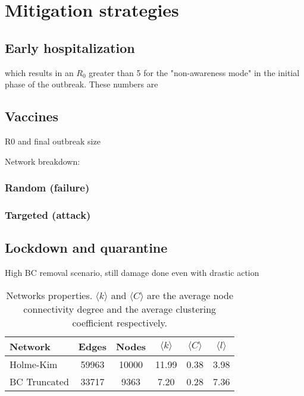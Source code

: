 \documentclass[DIV=12, BCOR=0pt]{scrartcl}  %
\begin{document}
  
  
  \section{Mitigation strategies} %
  \label{sec:immuni}
  
  
   
   \subsection{Early hospitalization}
   which results in an $R_0$ greater than 5 for the "non-awareness mode" in the initial phase of the outbreak. These numbers are
   \citep{Firth2020} 
  
  \subsection{Vaccines}
  R0 and final outbreak size
  
  Network breakdown:
  \subsubsection{Random (failure)}
	\subsubsection{Targeted (attack)}

	\subsection{Lockdown and quarantine}
	High BC removal scenario, still damage done even with drastic action
	
	\begin{table}[h!]
		\centering
		\caption{Networks properties. $\langle k \rangle$ and $\langle C \rangle$ are the average node connectivity degree and the average clustering coefficient respectively. }
		\label{tab:lock_networks}
		\begin{tabular}{lccccc}
			\toprule
			Network &  Edges &  Nodes & $\langle k \rangle$ & $\langle C \rangle$ & $\langle l \rangle$\\
			\midrule
			Holme-Kim 		&  59963 &  10000 & 11.99 &  0.38 &  3.98 \\
			BC Truncated 	&  33717 &   9363 &  7.20 &  0.28 &  7.36 \\
			
			\bottomrule
		\end{tabular}
	\end{table}
\end{document}
